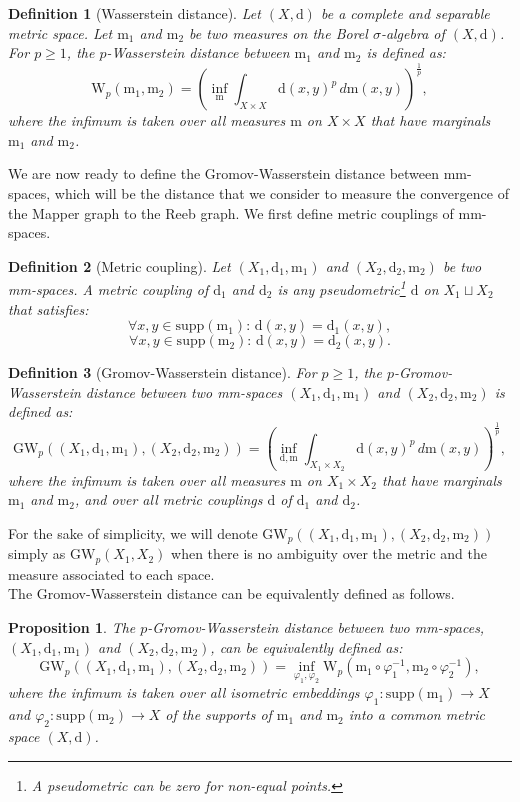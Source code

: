 \documentclass[pdflatex,sn-mathphys-ay]{sn-jnl}%
\newtheorem{definition}{Definition}
\newtheorem{proposition}{Proposition}[section]
\newcommand{\spa}{X}
\newcommand{\mes}{\mathrm{m}}
\newcommand{\dis}{\mathrm{d}}
\newcommand{\supp}{\mathrm{supp}}
\newcommand{\wasser}{\mathrm{W}}
\newcommand{\gromov}{\mathrm{GW}}
\newcommand{\change}[1]{\noindent #1}
\theoremstyle{thmstyleone}%
\begin{document}
\begin{definition}[\change{Wasserstein distance}]
Let $(\spa,\dis)$ be a complete and separable metric space. Let $\mes_1$ and $\mes_2$ be two measures on the Borel $\sigma$-algebra of $(\spa,\dis)$. For $p \geq 1$, the {\it $p$-Wasserstein distance} between $\mes_1$ and $\mes_2$ is defined as:
$$\wasser_p(\mes_1,\mes_2)=\left(\inf_{\mes}\int_{\spa\times\spa} \dis(x,y)^p\,d\mes(x,y)\right)^{\frac{1}{p}},$$
where the infimum is taken over all measures $\mes$ on $\spa\times \spa$ that have marginals $\mes_1$ and $\mes_2$.
\end{definition}

\change{We are now ready to define the Gromov-Wasserstein distance between mm-spaces, which will be the distance that we consider to measure the convergence of the Mapper graph to the Reeb graph. We first define metric couplings of mm-spaces.}

\begin{definition}[\change{Metric coupling}]
Let $(\spa_1,\dis_1,\mes_1)$ and $(\spa_2,\dis_2,\mes_2)$ be two mm-spaces.
A {\it metric coupling} of $\dis_1$ and $\dis_2$ is any pseudometric\footnote{A pseudometric can be zero for non-equal points.} $\dis$ on $\spa_1\sqcup \spa_2$ that satisfies:
$$\forall x,y\in \supp(\mes_1):\,\dis(x,y)=\dis_1(x,y),$$
$$\forall x,y\in \supp(\mes_2):\,\dis(x,y)=\dis_2(x,y).$$
\end{definition}

\begin{definition}[\change{Gromov-Wasserstein distance}]
 For $p \geq 1$, the  {\it $p$-Gromov-Wasserstein distance} between two mm-spaces $(\spa_1,\dis_1,\mes_1)$ and $(\spa_2,\dis_2,\mes_2)$ is defined as:
$$\gromov_p((\spa_1,\dis_1,\mes_1),(\spa_2,\dis_2,\mes_2))=\left(\inf_{\dis,\mes}\int_{\spa_1\times \spa_2} \dis(x,y)^p\,d\mes(x,y)\right)^{\frac{1}{p}},$$
where the infimum is taken over all measures $\mes$ on $\spa_1\times \spa_2$ that have marginals $\mes_1$ and $\mes_2$, and over all metric couplings $\dis$ of $\dis_1$ and $\dis_2$.
\end{definition}

    For the sake of simplicity, we will denote $\gromov_p((\spa_1,\dis_1,\mes_1),(\spa_2,\dis_2,\mes_2))$ simply as $\gromov_p(\spa_1,\spa_2)$ when there is no ambiguity over the metric and the measure associated to each space.\\
\change{The Gromov-Wasserstein distance can be equivalently defined as follows.}

\begin{proposition}\label{prop:gw_def}
The $p$-Gromov-Wasserstein distance between two mm-spaces, $(\spa_1,\dis_1,\mes_1)$ and $(\spa_2,\dis_2,\mes_2)$, can be equivalently defined as:
$$\gromov_p((\spa_1,\dis_1,\mes_1),(\spa_2,\dis_2,\mes_2))=\inf_{\varphi_1,\varphi_2}\wasser_p(\mes_1\circ\varphi_1^{-1},\mes_2\circ\varphi_2^{-1}),$$
where the infimum is taken over all isometric embeddings $\varphi_1\colon\supp(\mes_1)\rightarrow \spa$ and $\varphi_2\colon\supp(\mes_2)\rightarrow \spa$ of the supports of $\mes_1$ and $\mes_2$ into a common metric space $(\spa,\dis)$.
\end{proposition}
\end{document}
